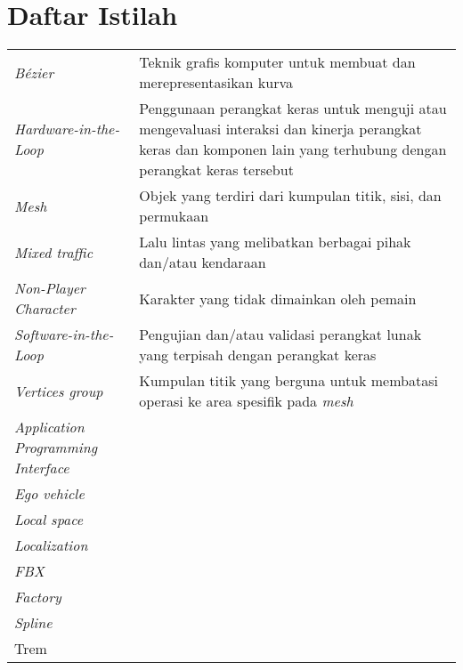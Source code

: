\chapter*{Daftar Istilah}

\begingroup
\begin{table}[h!]
\begin{onehalfspace}
\begin{tabular}{p{} p{}}
	\textit{Bézier} & Teknik grafis komputer untuk membuat dan merepresentasikan kurva \\
	\textit{Hardware-in-the-Loop} & Penggunaan perangkat keras untuk menguji atau mengevaluasi interaksi dan kinerja perangkat keras dan komponen lain yang terhubung dengan perangkat keras tersebut \\
	\textit{Mesh} & Objek yang terdiri dari kumpulan titik, sisi, dan permukaan \\
	\textit{Mixed traffic} & Lalu lintas yang melibatkan berbagai pihak dan/atau kendaraan \\
	\textit{Non-Player Character} & Karakter yang tidak dimainkan oleh pemain \\
	\textit{Software-in-the-Loop} & Pengujian dan/atau validasi perangkat lunak yang terpisah dengan perangkat keras \\
	\textit{Vertices group} & Kumpulan titik yang berguna untuk membatasi operasi ke area spesifik pada \textit{mesh} \\

	\textit{Application Programming Interface} & \\
	\textit{Ego vehicle} & \\
	\textit{Local space} & \\
	\textit{Localization} & \\
	\textit{FBX} &  \\
	\textit{Factory} &  \\
	\textit{Spline} &  \\
	Trem & \\



\end{tabular}
\end{onehalfspace}
\end{table}
